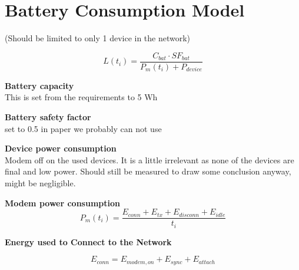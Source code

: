 \section{Battery Consumption Model}
\label{app:bat_model}
(Should be limited to only 1 device in the network)

\begin{equation}
L(t_i) = \frac{C_{bat}\cdot SF_{bat}}{P_m(t_i) + P_{device}}
\end{equation}
\begin{where}
\end{where}

\textbf{Battery capacity}\\
This is set from the requirements to 5 Wh

\textbf{Battery safety factor}\\
set to 0.5 in paper we probably can not use

\textbf{Device power consumption}\\
Modem off on the used devices. It is a little irrelevant as none of the devices are final and low power. Should still be measured to draw some conclusion anyway, might be negligible.

\textbf{Modem power consumption}\\

\begin{equation}
P_m(t_i) = \frac{E_{conn} + E_{tx} + E_{disconn} + E_{idle}}{t_i}
\end{equation}
\begin{where}
\end{where}

\textbf{Energy used to Connect to the Network}

\begin{equation}
E_{conn} = E_{modem,on} + E_{sync} + E_{attach}
\end{equation}

